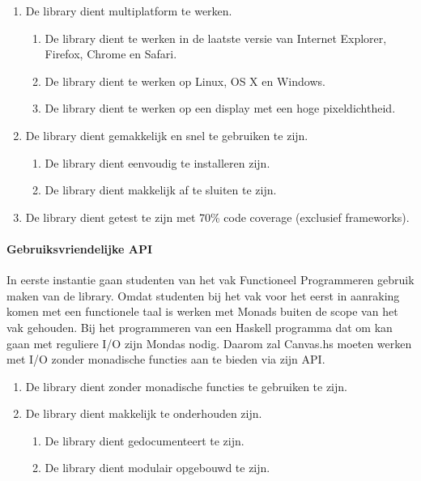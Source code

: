 \begin{enumerate}[label={R\arabic*}]
\setcounter{enumi}{\value{startvalue}}
	\item \label{req:multiplatform} De library dient multiplatform te werken.
	\begin{enumerate}[label={R\arabic{enumi}.\arabic*}]
		\item De library dient te werken in de laatste versie van Internet Explorer, Firefox, Chrome en Safari.
		\item De library dient te werken op Linux, OS X en Windows.
		\item De library dient te werken op een display met een hoge pixeldichtheid.
	\end{enumerate}
	\item \label{req:performance} De library dient gemakkelijk en snel te gebruiken te zijn.
	\begin{enumerate}[label={R\arabic{enumi}.\arabic*}]
		\item De library dient eenvoudig te installeren zijn.
		\item De library dient makkelijk af te sluiten te zijn.
	\end{enumerate}
	\item \label{req:coverage} De library dient getest te zijn met 70\% code coverage (exclusief frameworks).
	\setcounter{startvalue}{\value{enumi}}
\end{enumerate}

\paragraph{Gebruiksvriendelijke API}
In eerste instantie gaan studenten van het vak Functioneel Programmeren gebruik maken van de library. Omdat studenten bij het vak voor het eerst in aanraking komen met een functionele taal is werken met Monads buiten de scope van het vak gehouden. Bij het programmeren van een Haskell programma dat om kan gaan met reguliere I/O zijn Mondas nodig. Daarom zal Canvas.hs moeten werken met I/O zonder monadische functies aan te bieden via zijn API.

\begin{enumerate}[label={R\arabic*}]
\setcounter{enumi}{\value{startvalue}}
		\item \label{req:mondadisch} De library dient zonder monadische functies te gebruiken te zijn.
		\item \label{req:maintenance} De library dient makkelijk te onderhouden zijn.
		\begin{enumerate}[label={R\arabic{enumi}.\arabic*}]
			\item De library dient gedocumenteert te zijn.
			\item De library dient modulair opgebouwd te zijn.
		\end{enumerate}
	\setcounter{startvalue}{\value{enumi}}
\end{enumerate}